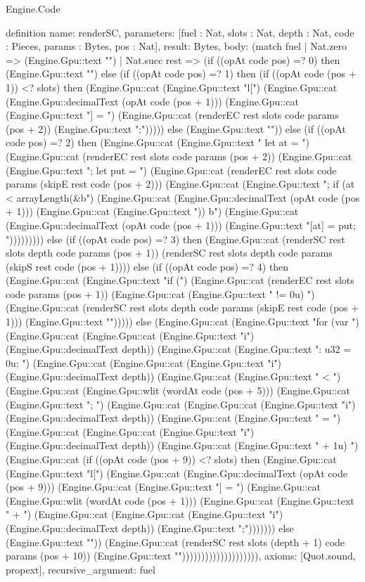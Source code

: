 \begin{lexlean}{Engine.Code}
\begin{semanticmodule}
definition{
  name: renderSC,
  parameters: [fuel : Nat, slots : Nat, depth : Nat, code : Pieces, params : Bytes, pos : Nat],
  result: Bytes,
  body: (match fuel
    | Nat.zero => (Engine.Gpu::text "")
    | Nat.succ rest => (if ((opAt code pos) =? 0) then (Engine.Gpu::text "") else (if ((opAt code pos) =? 1) then (if ((opAt code (pos + 1)) <? slots) then (Engine.Gpu::cat (Engine.Gpu::text "l[") (Engine.Gpu::cat (Engine.Gpu::decimalText (opAt code (pos + 1))) (Engine.Gpu::cat (Engine.Gpu::text "] = ") (Engine.Gpu::cat (renderEC rest slots code params (pos + 2)) (Engine.Gpu::text ";\n"))))) else (Engine.Gpu::text "")) else (if ((opAt code pos) =? 2) then (Engine.Gpu::cat (Engine.Gpu::text "{ let at = ") (Engine.Gpu::cat (renderEC rest slots code params (pos + 2)) (Engine.Gpu::cat (Engine.Gpu::text "; let put = ") (Engine.Gpu::cat (renderEC rest slots code params (skipE rest code (pos + 2))) (Engine.Gpu::cat (Engine.Gpu::text "; if (at < arrayLength(&b") (Engine.Gpu::cat (Engine.Gpu::decimalText (opAt code (pos + 1))) (Engine.Gpu::cat (Engine.Gpu::text ")) { b") (Engine.Gpu::cat (Engine.Gpu::decimalText (opAt code (pos + 1))) (Engine.Gpu::text "[at] = put; } }\n"))))))))) else (if ((opAt code pos) =? 3) then (Engine.Gpu::cat (renderSC rest slots depth code params (pos + 1)) (renderSC rest slots depth code params (skipS rest code (pos + 1)))) else (if ((opAt code pos) =? 4) then (Engine.Gpu::cat (Engine.Gpu::text "if (") (Engine.Gpu::cat (renderEC rest slots code params (pos + 1)) (Engine.Gpu::cat (Engine.Gpu::text " != 0u) {\n") (Engine.Gpu::cat (renderSC rest slots depth code params (skipE rest code (pos + 1))) (Engine.Gpu::text "}\n"))))) else (Engine.Gpu::cat (Engine.Gpu::text "for (var ") (Engine.Gpu::cat (Engine.Gpu::cat (Engine.Gpu::text "i") (Engine.Gpu::decimalText depth)) (Engine.Gpu::cat (Engine.Gpu::text ": u32 = 0u; ") (Engine.Gpu::cat (Engine.Gpu::cat (Engine.Gpu::text "i") (Engine.Gpu::decimalText depth)) (Engine.Gpu::cat (Engine.Gpu::text " < ") (Engine.Gpu::cat (Engine.Gpu::wlit (wordAt code (pos + 5))) (Engine.Gpu::cat (Engine.Gpu::text "; ") (Engine.Gpu::cat (Engine.Gpu::cat (Engine.Gpu::text "i") (Engine.Gpu::decimalText depth)) (Engine.Gpu::cat (Engine.Gpu::text " = ") (Engine.Gpu::cat (Engine.Gpu::cat (Engine.Gpu::text "i") (Engine.Gpu::decimalText depth)) (Engine.Gpu::cat (Engine.Gpu::text " + 1u) {\n") (Engine.Gpu::cat (if ((opAt code (pos + 9)) <? slots) then (Engine.Gpu::cat (Engine.Gpu::text "l[") (Engine.Gpu::cat (Engine.Gpu::decimalText (opAt code (pos + 9))) (Engine.Gpu::cat (Engine.Gpu::text "] = ") (Engine.Gpu::cat (Engine.Gpu::wlit (wordAt code (pos + 1))) (Engine.Gpu::cat (Engine.Gpu::text " + ") (Engine.Gpu::cat (Engine.Gpu::cat (Engine.Gpu::text "i") (Engine.Gpu::decimalText depth)) (Engine.Gpu::text ";\n"))))))) else (Engine.Gpu::text "")) (Engine.Gpu::cat (renderSC rest slots (depth + 1) code params (pos + 10)) (Engine.Gpu::text "}\n")))))))))))))))))))),
  axioms: [Quot.sound, propext],
  recursive_argument: fuel
}


\end{semanticmodule}
\end{lexlean}
